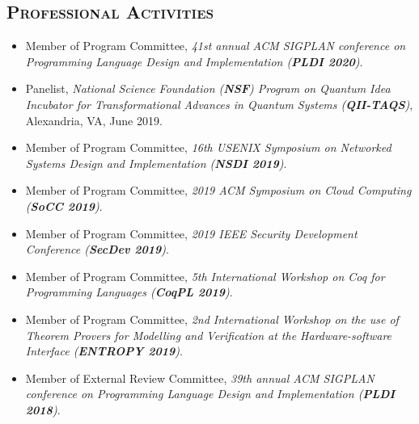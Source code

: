 \documentclass[10pt]{article}
\renewcommand{\section}[1]{
	\vspace{-5pt}
   	\subsection*{\scshape  \bfseries #1}
   }
\newenvironment{innerlist}[1][\enskip\textbullet]%
        {\begin{itemize}[#1,leftmargin=25pt,parsep=0pt,itemsep=2pt,topsep=2pt,partopsep=0pt]}
        {\end{itemize}}
\begin{document}
\section{Professional Activities}

\begin{innerlist}



\item[] Member of Program Committee,
\emph{41st annual ACM SIGPLAN conference on Programming Language Design and Implementation (\textbf{PLDI 2020})}.
\vspace{0.05in}

\item[] Panelist,  \emph{National Science Foundation (\textbf{NSF}) Program on Quantum Idea Incubator for Transformational Advances in Quantum Systems (\textbf{QII-TAQS})},  Alexandria, VA, June 2019.

\vspace{0.05in}

\item[] Member of Program Committee,
\emph{16th USENIX Symposium on Networked Systems Design and Implementation (\textbf{NSDI 2019})}.
\vspace{0.05in}

\item[] Member of Program Committee,
\emph{2019 ACM Symposium on Cloud Computing (\textbf{SoCC 2019})}.
\vspace{0.05in}

\item[] Member of Program Committee,
\emph{2019 IEEE Security Development Conference (\textbf{SecDev 2019})}.
\vspace{0.05in}

\item[] Member of Program Committee,
\emph{5th International Workshop on Coq for Programming Languages (\textbf{CoqPL 2019})}.
\vspace{0.05in}

\item[] Member of Program Committee,
\emph{2nd International Workshop on the use of Theorem Provers for Modelling and
Verification at the Hardware-software Interface (\textbf{ENTROPY 2019})}.
\vspace{0.05in}

\item[] Member of External Review Committee,
\emph{39th annual ACM SIGPLAN conference on Programming Language Design and Implementation (\textbf{PLDI 2018})}.
\vspace{0.05in}


\end{innerlist}
\end{document}
